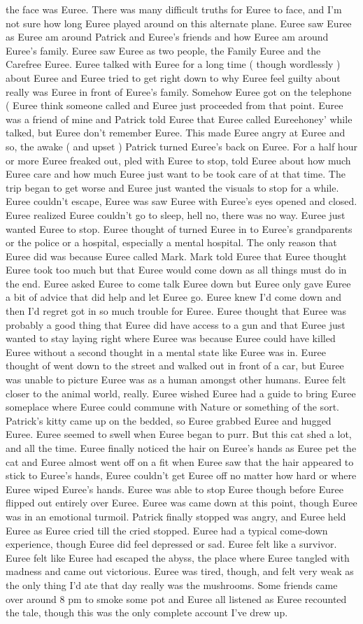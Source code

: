 \documentclass[12pt]{book}
\begin{document}
the face was Euree. There was many difficult truths for Euree to face, and I'm not sure how long Euree played around on this alternate plane. Euree saw Euree as Euree am around Patrick and Euree's friends and how Euree am around Euree's family. Euree saw Euree as two people, the Family Euree and the Carefree Euree. Euree talked with Euree for a long time ( though wordlessly ) about Euree and Euree tried to get right down to why Euree feel guilty about really was Euree in front of Euree's family. Somehow Euree got on the telephone ( Euree think someone called and Euree just proceeded from that point. Euree was a friend of mine and Patrick told Euree that Euree called Eureehoney' while talked, but Euree don't remember Euree. This made Euree angry at Euree and so, the awake ( and upset ) Patrick turned Euree's back on Euree. For a half hour or more Euree freaked out, pled with Euree to stop, told Euree about how much Euree care and how much Euree just want to be took care of at that time. The trip began to get worse and Euree just wanted the visuals to stop for a while. Euree couldn't escape, Euree was saw Euree with Euree's eyes opened and closed. Euree realized Euree couldn't go to sleep, hell no, there was no way. Euree just wanted Euree to stop. Euree thought of turned Euree in to Euree's grandparents or the police or a hospital, especially a mental hospital. The only reason that Euree did was because Euree called Mark. Mark told Euree that Euree thought Euree took too much but that Euree would come down as all things must do in the end. Euree asked Euree to come talk Euree down but Euree only gave Euree a bit of advice that did help and let Euree go. Euree knew I'd come down and then I'd regret got in so much trouble for Euree. Euree thought that Euree was probably a good thing that Euree did have access to a gun and that Euree just wanted to stay laying right where Euree was because Euree could have killed Euree without a second thought in a mental state like Euree was in. Euree thought of went down to the street and walked out in front of a car, but Euree was unable to picture Euree was as a human amongst other humans. Euree felt closer to the animal world, really. Euree wished Euree had a guide to bring Euree someplace where Euree could commune with Nature or something of the sort. Patrick's kitty came up on the bedded, so Euree grabbed Euree and hugged Euree. Euree seemed to swell when Euree began to purr. But this cat shed a lot, and all the time. Euree finally noticed the hair on Euree's hands as Euree pet the cat and Euree almost went off on a fit when Euree saw that the hair appeared to stick to Euree's hands, Euree couldn't get Euree off no matter how hard or where Euree wiped Euree's hands. Euree was able to stop Euree though before Euree flipped out entirely over Euree. Euree was came down at this point, though Euree was in an emotional turmoil. Patrick finally stopped was angry, and Euree held Euree as Euree cried till the cried stopped. Euree had a typical come-down experience, though Euree did feel depressed or sad. Euree felt like a survivor. Euree felt like Euree had escaped the abyss, the place where Euree tangled with madness and came out victorious. Euree was tired, though, and felt very weak as the only thing I'd ate that day really was the mushrooms. Some friends came over around 8 pm to smoke some pot and Euree all listened as Euree recounted the tale, though this was the only complete account I've drew up.
\end{document}
